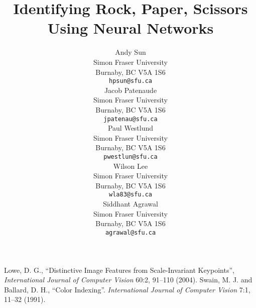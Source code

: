 \documentclass{article} %
\title{Identifying Rock, Paper, Scissors Using Neural Networks}
\author{
Andy Sun \\
Simon Fraser University\\
Burnaby, BC V5A 1S6 \\
\texttt{hpsun@sfu.ca} \\
\And
Jacob Patenaude \\
Simon Fraser University\\
Burnaby, BC V5A 1S6 \\
\texttt{jpatenau@sfu.ca} \\
\And
Paul Westlund \\
Simon Fraser University\\
Burnaby, BC V5A 1S6 \\
\texttt{pwestlun@sfu.ca} \\
\And
Wilson Lee \\
Simon Fraser University\\
Burnaby, BC V5A 1S6 \\
\texttt{wla83@sfu.ca} \\
\And
Siddhant Agrawal \\
Simon Fraser University\\
Burnaby, BC V5A 1S6 \\
\texttt{agrawal@sfu.ca} \\
}
\begin{document}
\maketitle

\begin{abstract}

\end{abstract}










\newpage


\begin{thebibliography}{99}
 Lowe, D. G., ``Distinctive Image Features from Scale-Invariant Keypoints'', \textit{International Journal of Computer Vision} 60:2, 91--110 (2004).
 Swain, M. J. and Ballard, D. H., ``Color Indexing''. \textit{International Journal of Computer Vision} 7:1, 11--32 (1991).
\end{thebibliography}
\end{document}

